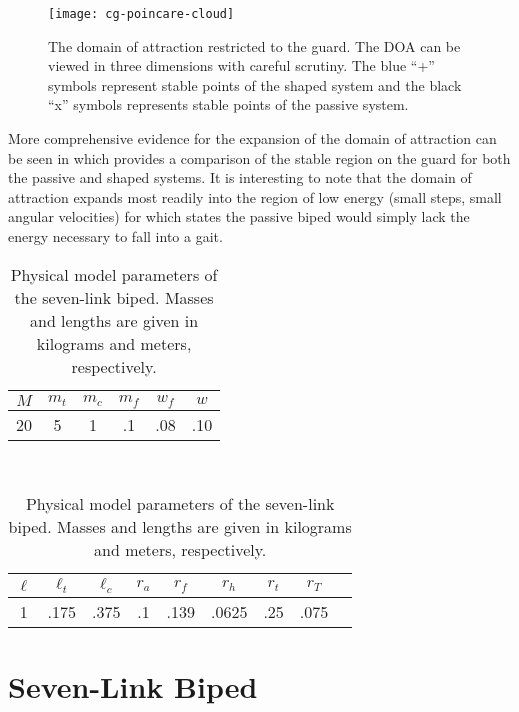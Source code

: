 \begin{figure}[t!]
  \centering
  \centering
  \texttt{[image: cg-poincare-cloud]}
  \caption[The domain of attraction restricted to the guard.]{The domain of
    attraction restricted to the guard.
    The DOA can be viewed in three dimensions with careful scrutiny.
    The blue ``+'' symbols represent stable points of the shaped system and the
    black ``x'' symbols represents stable points of the passive system.}
  \label{fig:point-cloud}
  \vspace{-1em}
\end{figure}


More comprehensive evidence for the expansion of the domain of attraction can be
seen in  which provides a comparison of the stable
region on the guard for both the passive and shaped systems.
% 
It is interesting to note that the domain of attraction expands most readily
into the region of low energy (small steps, small angular velocities) for which
states the passive biped would simply lack the energy necessary to fall into a
gait.



\begin{table}[t!]
  \begin{center}
    \caption[Physical model parameters of the seven-link biped.]{Physical model
      parameters of the seven-link biped. Masses and lengths are given in
      kilograms and meters, respectively.}
    \label{tab:7link-model-parameters}
    \begin{tabular}{|c|c|c|c|c|c|}
      \hline
      $M$ & $m_{t}$ & $m_{c}$ &
      $m_{f}$ & $w_{f}$ & $w$\\
      \hline
      20 & 5 & 1 & .1 & .08 & .10 \\
      \hline
    \end{tabular}\\[.1em]
    \begin{tabular}{|c|c|c|c|c|c|c|c|c|}
      \hline
      $\ell$ & $\ell_{t}$ & $\ell_{c}$ &
      $r_{a}$ & $r_{f}$ & $r_{h}$ & $r_{t}$ & $r_{T} $\\
      \hline
      1 & .175 & .375 & .1 & .139 & .0625 & .25 & .075\\
      \hline
    \end{tabular}
  \end{center}
\end{table}

\section{Seven-Link Biped}

